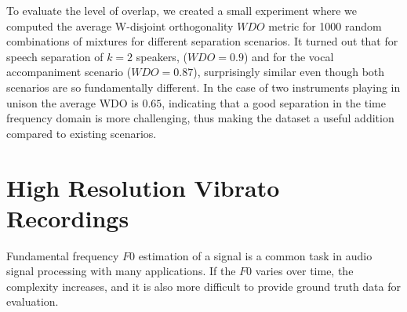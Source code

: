 To evaluate the level of overlap, we created a small experiment where we computed the average W-disjoint orthogonality \(WDO\) metric for 1000 random combinations of mixtures for different separation scenarios.
It turned out that for speech separation of \(k=2\) speakers, (\(WDO=0.9\)) and for the vocal accompaniment scenario (\(WDO=0.87\)), surprisingly similar even though both scenarios are so fundamentally different.
In the case of two instruments playing in unison the average WDO is \(0.65\), indicating that a good separation in the time frequency domain is more challenging, thus making the dataset a useful addition compared to existing scenarios.


\section{High Resolution Vibrato Recordings}%
\label{sec:muserc}

Fundamental frequency \(F0\) estimation of a signal is a common task in audio signal processing with many applications. 
If the $F0$ varies over time, the complexity increases, and it is also more difficult to provide ground truth data for evaluation.

